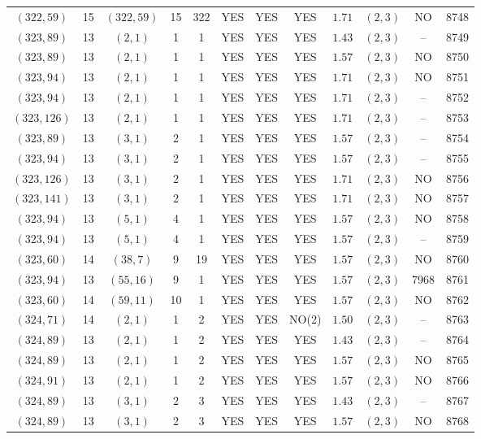 \begin{longtable}{|c|c|c|c|c|c|c|c|c|c|c|c|}
$(322,59)$ & 15 & $(322,59)$ & 15 & 322 & YES & YES & YES & $1.71$ & $(2,3)$ & NO & 8748\\
$(323,89)$ & 13 & $(2,1)$ & 1 & 1 & YES & YES & YES & $1.43$ & $(2,3)$ & -- & 8749\\
$(323,89)$ & 13 & $(2,1)$ & 1 & 1 & YES & YES & YES & $1.57$ & $(2,3)$ & NO & 8750\\
$(323,94)$ & 13 & $(2,1)$ & 1 & 1 & YES & YES & YES & $1.71$ & $(2,3)$ & NO & 8751\\
$(323,94)$ & 13 & $(2,1)$ & 1 & 1 & YES & YES & YES & $1.71$ & $(2,3)$ & -- & 8752\\
$(323,126)$ & 13 & $(2,1)$ & 1 & 1 & YES & YES & YES & $1.71$ & $(2,3)$ & -- & 8753\\
$(323,89)$ & 13 & $(3,1)$ & 2 & 1 & YES & YES & YES & $1.57$ & $(2,3)$ & -- & 8754\\
$(323,94)$ & 13 & $(3,1)$ & 2 & 1 & YES & YES & YES & $1.57$ & $(2,3)$ & -- & 8755\\
$(323,126)$ & 13 & $(3,1)$ & 2 & 1 & YES & YES & YES & $1.71$ & $(2,3)$ & NO & 8756\\
$(323,141)$ & 13 & $(3,1)$ & 2 & 1 & YES & YES & YES & $1.71$ & $(2,3)$ & NO & 8757\\
$(323,94)$ & 13 & $(5,1)$ & 4 & 1 & YES & YES & YES & $1.57$ & $(2,3)$ & NO & 8758\\
$(323,94)$ & 13 & $(5,1)$ & 4 & 1 & YES & YES & YES & $1.57$ & $(2,3)$ & -- & 8759\\
$(323,60)$ & 14 & $(38,7)$ & 9 & 19 & YES & YES & YES & $1.57$ & $(2,3)$ & NO & 8760\\
$(323,94)$ & 13 & $(55,16)$ & 9 & 1 & YES & YES & YES & $1.57$ & $(2,3)$ & 7968 & 8761\\
$(323,60)$ & 14 & $(59,11)$ & 10 & 1 & YES & YES & YES & $1.57$ & $(2,3)$ & NO & 8762\\
$(324,71)$ & 14 & $(2,1)$ & 1 & 2 & YES & YES & NO(2) & $1.50$ & $(2,3)$ & -- & 8763\\
$(324,89)$ & 13 & $(2,1)$ & 1 & 2 & YES & YES & YES & $1.43$ & $(2,3)$ & -- & 8764\\
$(324,89)$ & 13 & $(2,1)$ & 1 & 2 & YES & YES & YES & $1.57$ & $(2,3)$ & NO & 8765\\
$(324,91)$ & 13 & $(2,1)$ & 1 & 2 & YES & YES & YES & $1.57$ & $(2,3)$ & NO & 8766\\
$(324,89)$ & 13 & $(3,1)$ & 2 & 3 & YES & YES & YES & $1.43$ & $(2,3)$ & -- & 8767\\
$(324,89)$ & 13 & $(3,1)$ & 2 & 3 & YES & YES & YES & $1.57$ & $(2,3)$ & NO & 8768\\

\end{longtable}
